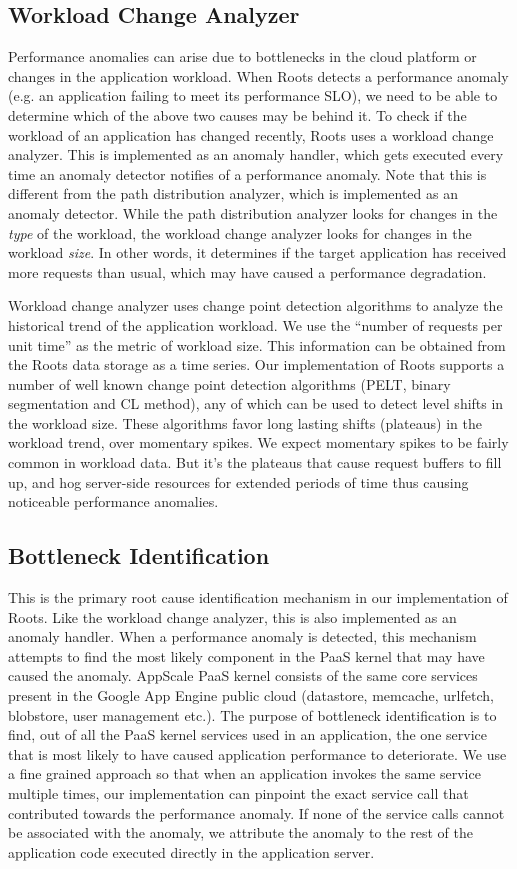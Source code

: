 \subsection{Workload Change Analyzer}
Performance anomalies can arise due to bottlenecks in the cloud platform or changes in the application
workload.
When Roots detects a performance anomaly (e.g. an application failing to meet its performance SLO),
we need to be able to determine which of the above two causes may be behind it.
To check if the workload of an application has changed recently, Roots uses a workload change analyzer.
This is implemented as an anomaly handler, which gets executed every time an anomaly detector
notifies of a performance anomaly. Note that this is different from the path distribution analyzer,
which is implemented as an anomaly detector. While the path distribution analyzer looks for changes in the
\textit{type} of the workload, the workload change analyzer looks for changes in the workload \textit{size}.
In other words, it determines if the target application has received more requests than usual, which
may have caused a performance degradation.

Workload change analyzer uses change point detection algorithms to analyze the historical trend of 
the application workload. We use the ``number of requests
per unit time'' as the metric of workload size. This information can be obtained from the Roots
data storage as a time series. Our implementation of Roots supports a number of well known change point
detection algorithms (PELT, binary segmentation and CL method), any of which can be used to detect level shifts in the
workload size. These algorithms favor long lasting shifts (plateaus) in the workload trend, over momentary spikes.
We expect momentary spikes to be fairly common in workload data. But it's the plateaus that cause
request buffers to fill up, and hog server-side resources for extended periods of time thus
causing noticeable performance anomalies.

\subsection{Bottleneck Identification}
This is the primary root cause identification mechanism in our implementation of Roots. Like the workload
change analyzer, this is also implemented
as an anomaly handler. When a performance anomaly is detected, this mechanism attempts to find the
most likely component in the PaaS kernel that may have caused the anomaly. AppScale PaaS kernel
consists of the same core services present in the Google App Engine public cloud (datastore, memcache,
urlfetch, blobstore, user management etc.). The purpose of bottleneck identification is to find, out of all
the PaaS kernel services used in an application, the one service that is most likely to have caused 
application performance to deteriorate. We use a fine grained approach so that when an application
invokes the same service multiple times, our implementation can pinpoint the exact service call that
contributed towards the performance anomaly. If none of the service calls cannot be associated with
the anomaly, we attribute the anomaly to the rest of the application code executed
directly in the application server.

